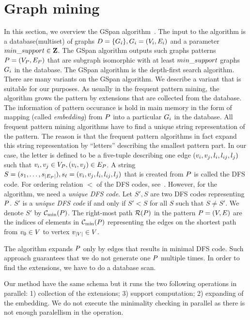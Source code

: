 \section{Graph mining}

In this section, we overview the GSpan algorithm~\cite{gspan}. The
input to the algorithm is a database(multiset) of graphs
$D=\{G_i\}, G_i=(V_i, E_i)$ and a parameter
$min\_support\in\mathbf{Z}$. The GSpan algorithm outputs such graphs patterns
$P=(V_P, E_P)$ that are subgraph isomorphic
with at least $min\_support$ graphs $G_i$ in the database. The GSpan
algorithm is the depth-first search algorithm. There are many variants
on the GSpan algorithm. We describe a variant that is suitable for our
purposes. As usually in the frequent pattern mining, the algorithm
grows the pattern by extensions that are collected from the
database. The information of pattern occurance is hold in main memory
in the form of mapping (called \emph{embedding}) from $P$ into
a particular $G_i$ in the database. All frequent pattern mining
algorithms have to find a unique string representation of the
pattern. The reason is that the frequent pattern algorithms in fact
expand this string representation by ``letters'' describing the
smallest pattern part. In our case, the letter is defined to be a
five-tuple describing one edge $(v_i, v_j, l_i, l_{ij},
l_j)$ such that $v_i, v_j\in V_P,
(v_i,v_j)\in E_P$. A string
$S=(s_1,\ldots,s_{|E_P|}), s_\ell=(v_i, v_j, l_i,
l_{ij}, l_j)$ that is created from $P$ is called the DFS
code. For ordering relation $<$ of the DFS codes,
see~\cite{gspan}. However, for the algorithm, we need a \emph{unique
  DFS code}. Let $S',S$ are two DFS codes representing
$P$. $S'$ is a \emph{unique DFS code} if and only if $S'< S$
for all $S$ such that $S\neq S'$. We denote $S'$ by
$\mindfscode(\pattern)$. The right-most path $\mathcal{R}(P)$ in
the pattern $P = (V, E)$ are the indices of elements in
$\mindfscode(\pattern)$ representing the edges on the shortest path
from $v_0 \in V$ to vertex $v_{|V|} \in V$.

The algorithm expands $P$ only by edges that results in minimal
DFS code. Such approach guarantees that we do not generate one
$P$ multiple times. In order to find the extensions, we have to
do a database scan. 



Our method have the same schema but it runs the two following
operations in parallel: 1) collection of the extensions; 3) support
computation; 2) expanding of the embedding. We do not execute the
minimality checking in parallel as there is not enough paralellism in
the operation.


